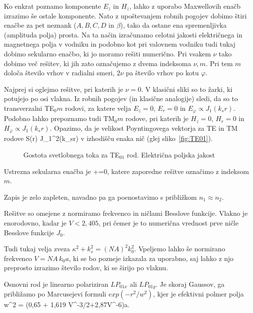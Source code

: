 Ko enkrat poznamo komponente $E_z$ in $H_z$, lahko z uporabo Maxwellovih enačb izrazimo še ostale
komponente. Nato z upoštevanjem robnih pogojev dobimo štiri enačbe za pet neznank ($A,B,C,D$ in $\beta$),
tako da ostane ena spremenljivka (amplituda polja) prosta. Na ta način izračunamo celotni 
jakosti električnega in magnetnega polja v vodniku in podobno kot pri valovnem vodniku 
tudi tukaj dobimo sekularno enačbo, ki jo moramo rešiti numerično. Pri vsakem $\nu$ tako dobimo več
rešitev, ki jih zato označujemo z dvema indeksoma $\nu,m$. Pri tem $m$ določa število vrhov v
radialni smeri, $2\nu$ pa število vrhov po kotu $\varphi$. 

Najprej si oglejmo rešitve, pri katerih je $\nu=0$. V klasični sliki so to žarki, ki potujejo
po osi vlakna. Iz robnih pogojev (in klasične analogije) sledi, da 
so to transverzalni TE$_0m$ rodovi, za katere velja $E_z=0$, $E_r=0$ in $E_\varphi \propto J_1(k_sr)$.
Podobno lahko prepoznamo tudi TM$_0m$ rodove, pri katerih je $H_z=0$, $H_r=0$ in $H_\varphi \propto J_1(k_sr)$.
Opazimo, da je velikost Poyntingovega vektorja za TE in TM rodove 
\beq
S(r) \propto J_1^2(k_sr)
\eeq
v izhodišču enaka nič (glej sliko~\ref{fig:TE01}).
\begin{figure}[h]
\centering
\def\svgwidth{90truemm} 
 
\caption{Gostota svetlobnega toka za TE$_01$ rod. Električna poljska jakost }
\label{fig:GRIN}
\end{figure}




Ustrezna sekularna enačba je
\beq
{}+=0,
\eeq
katere zaporedne rešitve označimo z indeksom $m$. 





Zapis je zelo zapleten, navadno pa ga poenostavimo s približkom $n_1 \approx n_2$. 

Rešitve so omejene z normiramo frekvenco in ničlami Besslove funkcije. Vlakno je enorodovno, kadar
je $V<2,405$, pri čemer je to numerična vrednost prve ničle Besslove funkcije $J_0$. 


Tudi tukaj velja zveza $\kappa^2+k_s^2=(NA)^2k_0^2$. Vpeljemo lahko še normirano frekvenco 
$V = NA\, k_0 a$, ki se bo pozneje izkazala za uporabno, saj lahko z njo preprosto izrazimo število
rodov, ki se širijo po vlaknu.


Osnovni rod je linearno polariziran $LP_{01x}$ ali $LP_{01y}$. Je skoraj Gaussov, ga približamo 
po Marcusejevi formuli $exp(-r^2/w^2)$,
kjer je efektivni polmer polja
\beq 
w^2 = (0,65 + 1,619 V^{-3/2}+2,87V^{-6})a.
\eeq

